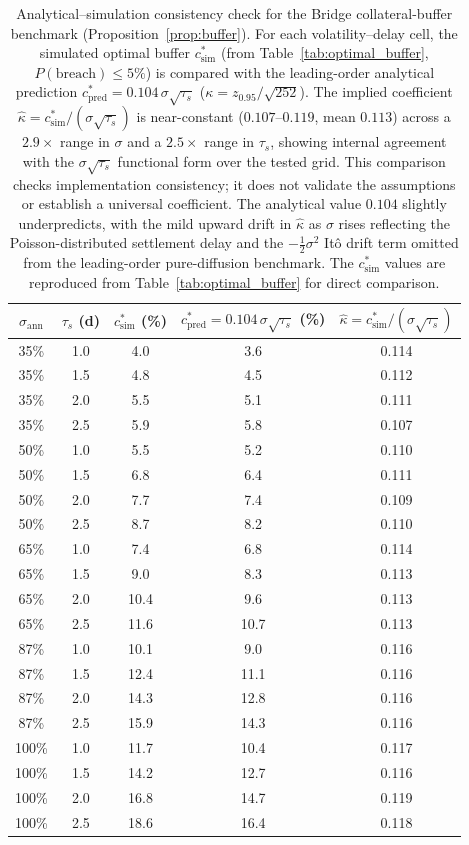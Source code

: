 \begin{table}[htbp]
\centering
\footnotesize
\renewcommand{\arraystretch}{1.05}
\caption{Analytical--simulation consistency check for the Bridge collateral-buffer benchmark (Proposition~\ref{prop:buffer}). For each volatility--delay cell, the simulated optimal buffer $c^*_{\mathrm{sim}}$ (from Table~\ref{tab:optimal_buffer}, $P(\text{breach})\le 5\%$) is compared with the leading-order analytical prediction $c^*_{\mathrm{pred}}=0.104\,\sigma\sqrt{\tau_s}$ ($\kappa=z_{0.95}/\sqrt{252}$). The implied coefficient $\hat\kappa=c^*_{\mathrm{sim}}/(\sigma\sqrt{\tau_s})$ is near-constant ($0.107$--$0.119$, mean $0.113$) across a $2.9\times$ range in $\sigma$ and a $2.5\times$ range in $\tau_s$, showing internal agreement with the $\sigma\sqrt{\tau_s}$ functional form over the tested grid. This comparison checks implementation consistency; it does not validate the assumptions or establish a universal coefficient. The analytical value $0.104$ slightly underpredicts, with the mild upward drift in $\hat\kappa$ as $\sigma$ rises reflecting the Poisson-distributed settlement delay and the $-\tfrac{1}{2}\sigma^{2}$ It\^{o} drift term omitted from the leading-order pure-diffusion benchmark. The $c^*_{\mathrm{sim}}$ values are reproduced from Table~\ref{tab:optimal_buffer} for direct comparison.}
\label{tab:analytic_validation}
\begin{tabular}{ccccc}
\hline
$\sigma_{\mathrm{ann}}$ & $\tau_s$ (d) & $c^*_{\mathrm{sim}}$ (\%) & $c^*_{\mathrm{pred}}=0.104\,\sigma\sqrt{\tau_s}$ (\%) & $\hat\kappa=c^*_{\mathrm{sim}}/(\sigma\sqrt{\tau_s})$ \\
\hline
35\% & 1.0 & 4.0 & 3.6 & 0.114 \\
35\% & 1.5 & 4.8 & 4.5 & 0.112 \\
35\% & 2.0 & 5.5 & 5.1 & 0.111 \\
35\% & 2.5 & 5.9 & 5.8 & 0.107 \\
\hline
50\% & 1.0 & 5.5 & 5.2 & 0.110 \\
50\% & 1.5 & 6.8 & 6.4 & 0.111 \\
50\% & 2.0 & 7.7 & 7.4 & 0.109 \\
50\% & 2.5 & 8.7 & 8.2 & 0.110 \\
\hline
65\% & 1.0 & 7.4 & 6.8 & 0.114 \\
65\% & 1.5 & 9.0 & 8.3 & 0.113 \\
65\% & 2.0 & 10.4 & 9.6 & 0.113 \\
65\% & 2.5 & 11.6 & 10.7 & 0.113 \\
\hline
87\% & 1.0 & 10.1 & 9.0 & 0.116 \\
87\% & 1.5 & 12.4 & 11.1 & 0.116 \\
87\% & 2.0 & 14.3 & 12.8 & 0.116 \\
87\% & 2.5 & 15.9 & 14.3 & 0.116 \\
\hline
100\% & 1.0 & 11.7 & 10.4 & 0.117 \\
100\% & 1.5 & 14.2 & 12.7 & 0.116 \\
100\% & 2.0 & 16.8 & 14.7 & 0.119 \\
100\% & 2.5 & 18.6 & 16.4 & 0.118 \\
\hline
\end{tabular}
\end{table}
